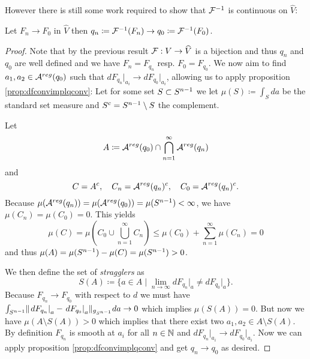 However there is still some work required to show that $\mathcal{F}^{-1}$ is continuous on $\widehat{V}$:
\begin{lemma}\label{lem:frevcont} Let $F_n \to F_0$ in $\widehat{V}$ then $q_n\coloneqq \mathcal{F}^{-1}(F_n) \to q_0\coloneqq \mathcal{F}^{-1}(F_0)$.
\end{lemma}
\begin{proof}
    Note that by the previous result $\mathcal{F}:V\to \widehat{V}$ is a bijection and thus $q_n$ and $q_0$ are well defined and we have $F_n = F_{q_n}$ resp. $F_0 = F_{q_0}$. We now aim to find $a_1,a_2\in {{\mathcal{A}}^{reg}}(q_0)$ such that $dF_{q_n}\rvert_{a_i}\to dF_{q_0}\rvert_{a_i}$, allowing us to apply proposition \ref{prop:dfconvimplqconv}: Let for some set $S\subset {S^{n-1}}$ we let $\mu(S)\coloneqq  \int_{S}da$ be the standard set measure and $S^c = {S^{n-1}} \setminus S$ the complement.

    Let \[
        A\coloneqq {{\mathcal{A}}^{reg}}(q_0) \cap \bigcap_{n=1}^{\infty}{{\mathcal{A}}^{reg}}(q_n)
    \] and
    \[
        C = A^c, \quad C_n = {{\mathcal{A}}^{reg}}(q_n)^c, \quad C_0 = {{\mathcal{A}}^{reg}}(q_n)^c.
    \]
    Because $\mu({{\mathcal{A}}^{reg}}(q_n))=\mu({{\mathcal{A}}^{reg}}(q_0))=\mu({S^{n-1}})<\infty$, we have $\mu(C_n)=\mu(C_0)=0$. This yields 
    \[
        \mu(C)= \mu\left(C_0 \cup \bigcup_{n=1}^{\infty}C_n\right) \leq \mu(C_0) + \sum_{n=1}^\infty \mu(C_n) = 0
    \] and thus $\mu(A)=\mu({S^{n-1}})-\mu(C)=\mu({S^{n-1}})>0$.

    We then define the set of \emph{stragglers} as 
    \[
        S(A)\coloneqq \{a\in A \mid \lim_{n\to \infty} dF_{q_n}\rvert_a \neq dF_{q_0}\rvert_a\}.
    \] Because $F_{q_n}\to F_{q_0}$ with respect to $d$ we must have $\int_{{S^{n-1}}} \lVert \left.dF_{q_n}\right\rvert_a - \left.dF_{q_0}\right\rvert_a \rVert_{g_{S^{n-1}}}da \to 0$ which implies $\mu(S(A))=0$. But now we have $\mu(A\setminus S(A)) > 0$ which implies that there exist two $a_1,a_2\in A\setminus S(A)$. By definition $F_{q_n}$ is smooth at $a_i$ for all $n\in \mathbb{N}$ and $dF_{q_n}\rvert_{a_i} \to dF_{q_0}\rvert_{a_i}$. Now we can apply proposition \ref{prop:dfconvimplqconv} and get $q_n\to q_0$ as desired.
\end{proof}


